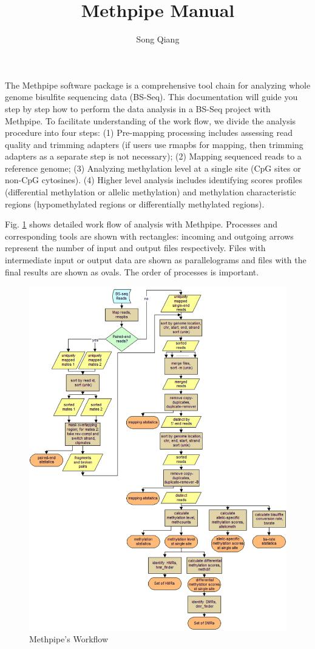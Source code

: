 \documentclass{article}
\title{Methpipe Manual}
\author{Song Qiang}
\begin{document}
\maketitle
The Methpipe software package is a comprehensive tool chain for
analyzing whole genome bisulfite sequencing data (BS-Seq).  This
documentation will guide you step by step how to perform the
data analysis in a BS-Seq project with Methpipe. To facilitate
understanding of the work flow, we divide the analysis procedure into
four steps: (1) Pre-mapping processing includes assessing
read quality and  trimming adapters (if users use rmapbs for mapping, then 
trimming adapters as a separate step is not necessary); (2)
Mapping sequenced reads to a reference genome; (3)
Analyzing methylation level at a single site (CpG sites or
non-CpG cytosines). (4) Higher level analysis includes
identifying scores profiles (differential methylation or allelic methylation) 
and methylation characteristic regions (hypomethylated regions or 
differentially methylated regions). 

Fig. \ref{fig:workflow}  shows detailed work flow of analysis with Methpipe.
Processes and corresponding tools are shown with rectangles: incoming and outgoing 
arrows represent the number of input and output files respectively.
Files with intermediate input or output data are shown as parallelograms
and files with the final results are shown as ovals.
The order of processes is important.
\begin{figure}[htbp]
  \centering
  \includegraphics[width=6.3in]{figs/Methpipe_work_flow.pdf}
  \caption{Methpipe's Workflow}
  \label{fig:workflow}
\end{figure}
 
\end{document}
